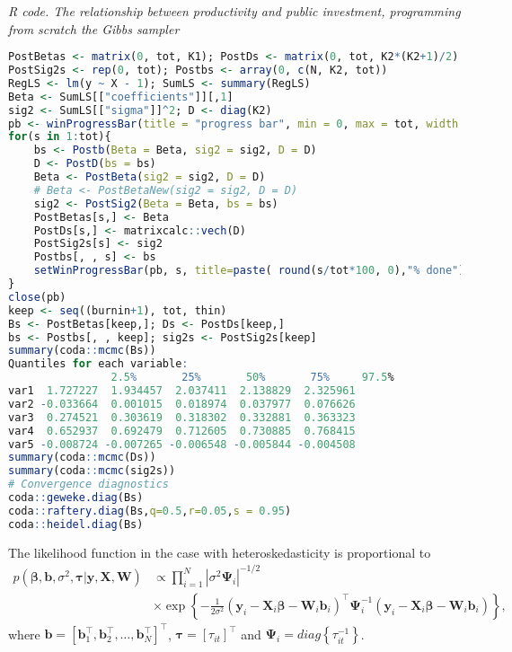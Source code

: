 \begin{enumerate}[leftmargin=*]
\begin{tcolorbox}[enhanced,width=4.67in,center upper,
	fontupper=\large\bfseries,drop shadow southwest,sharp corners]
	\textit{R code. The relationship between productivity and public investment, programming from scratch the Gibbs sampler}
	\begin{VF}
		\begin{lstlisting}[language=R]
PostBetas <- matrix(0, tot, K1); PostDs <- matrix(0, tot, K2*(K2+1)/2)
PostSig2s <- rep(0, tot); Postbs <- array(0, c(N, K2, tot))
RegLS <- lm(y ~ X - 1); SumLS <- summary(RegLS)
Beta <- SumLS[["coefficients"]][,1]
sig2 <- SumLS[["sigma"]]^2; D <- diag(K2)
pb <- winProgressBar(title = "progress bar", min = 0, max = tot, width = 300)
for(s in 1:tot){
	bs <- Postb(Beta = Beta, sig2 = sig2, D = D)
	D <- PostD(bs = bs)
	Beta <- PostBeta(sig2 = sig2, D = D)
	# Beta <- PostBetaNew(sig2 = sig2, D = D)
	sig2 <- PostSig2(Beta = Beta, bs = bs)
	PostBetas[s,] <- Beta
	PostDs[s,] <- matrixcalc::vech(D)
	PostSig2s[s] <- sig2
	Postbs[, , s] <- bs
	setWinProgressBar(pb, s, title=paste( round(s/tot*100, 0),"% done"))
}
close(pb)
keep <- seq((burnin+1), tot, thin)
Bs <- PostBetas[keep,]; Ds <- PostDs[keep,]
bs <- Postbs[, , keep]; sig2s <- PostSig2s[keep]
summary(coda::mcmc(Bs))
Quantiles for each variable:
				2.5%       25%       50%       75%     97.5%
var1  1.727227  1.934457  2.037411  2.138829  2.325961
var2 -0.033664  0.001015  0.018974  0.037977  0.076626
var3  0.274521  0.303619  0.318302  0.332881  0.363323
var4  0.652937  0.692479  0.712605  0.730885  0.768415
var5 -0.008724 -0.007265 -0.006548 -0.005844 -0.004508
summary(coda::mcmc(Ds))
summary(coda::mcmc(sig2s))
# Convergence diagnostics
coda::geweke.diag(Bs)
coda::raftery.diag(Bs,q=0.5,r=0.05,s = 0.95)
coda::heidel.diag(Bs)
\end{lstlisting}
	\end{VF}
\end{tcolorbox}
The likelihood function in the case with heteroskedasticity is proportional to 
	\begin{align*}
		p(\bm{\beta},\bm{b},\sigma^2,\bm{\tau}|\bm{y}, \bm{X},\bm{W}) & \propto \prod_{i=1}^N |\sigma^2 \bm{\Psi}_i|^{-1/2}\\
		&\times \exp\left\{-\frac{1}{2\sigma^2}(\bm{y}_i-\bm{X}_i\bm{\beta}-\bm{W}_i\bm{b}_i)^{\top}\bm{\Psi}^{-1}_i(\bm{y}_i-\bm{X}_i\bm{\beta}-\bm{W}_i\bm{b}_i)\right\},
	\end{align*} 
where $\bm{b}=[\bm{b}_1^{\top}, \bm{b}_2^{\top},\dots, \bm{b}_N^{\top}]^{\top}$, $\bm{\tau}=[\tau_{it}]^{\top}$ and $\bm{\Psi}_i=diag\left\{\tau_{it}^{-1}\right\}$. 


\end{enumerate}
